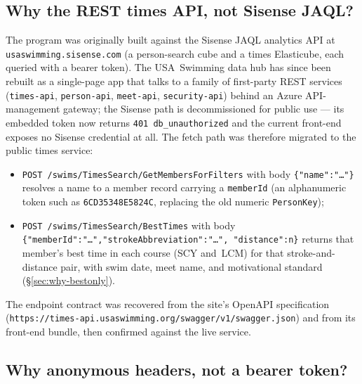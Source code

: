 \documentclass[12pt]{article}
\newcommand{\code}[1]{\texttt{#1}}
\begin{document}
\subsection{Why the REST times API, not Sisense JAQL?}
\label{sec:why-rest}

The program was originally built against the Sisense JAQL analytics
API at \code{usaswimming.sisense.com} (a person-search cube and a
times Elasticube, each queried with a bearer token).  The USA~Swimming
data hub has since been rebuilt as a single-page app that talks to a
family of first-party REST services
(\code{times-api}, \code{person-api}, \code{meet-api},
\code{security-api}) behind an Azure API-management gateway; the
Sisense path is decommissioned for public use --- its embedded token
now returns \code{401 db\_unauthorized} and the current front-end
exposes no Sisense credential at all.  The fetch path was therefore
migrated to the public times service:

\begin{itemize}
  \item \code{POST /swims/TimesSearch/GetMembersForFilters} with body
        \code{\{"name":"\dots"\}} resolves a name to a member record
        carrying a \code{memberId} (an alphanumeric token such as
        \code{6CD35348E5824C}, replacing the old numeric
        \code{PersonKey});
  \item \code{POST /swims/TimesSearch/BestTimes} with body
        \code{\{"memberId":"\dots","strokeAbbreviation":"\dots",%
        "distance":n\}} returns that member's best time in each course
        (SCY and~LCM) for that stroke-and-distance pair, with swim
        date, meet name, and motivational standard
        (\S\ref{sec:why-bestonly}).
\end{itemize}

\noindent The endpoint contract was recovered from the site's
OpenAPI specification
(\code{https://times-api.usaswimming.org/swagger/v1/swagger.json})
and from its front-end bundle, then confirmed against the live service.

\subsection{Why anonymous headers, not a bearer token?}
\label{sec:why-anon}
\end{document}
